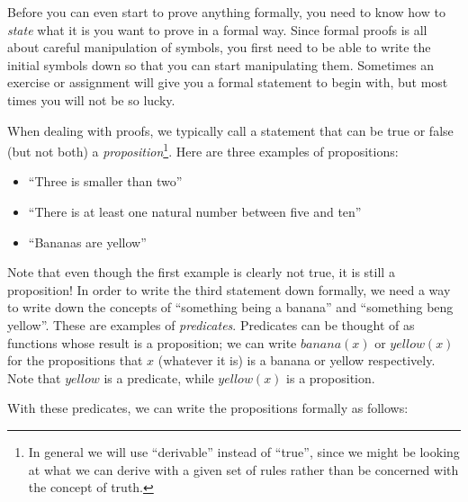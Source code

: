 \documentclass{tufte-handout}
\newcounter{example}
\begin{document}

Before you can even start to prove anything formally, you need to
know how to \emph{state} what it is you want to prove in a formal
way. Since formal proofs is all about careful manipulation of
symbols, you first need to be able to write the initial symbols
down so that you can start manipulating them. Sometimes an
exercise or assignment will give you a formal statement to begin
with, but most times you will not be so lucky.

When dealing with proofs, we typically call a statement that can
be true or false (but not both) a \emph{proposition}\footnote{In
  general we will use ``derivable'' instead of ``true'', since we
  might be looking at what we can derive with a given set of rules
  rather than be concerned with the concept of truth. }. Here are
three examples of propositions:
\begin{itemize}
\item ``Three is smaller than two''
\item ``There is at least one natural number between five
and ten''
\item ``Bananas are yellow''
\end{itemize}

\noindent
Note that even though the first example is clearly not true, it is
still a proposition!
%
In order to write the third statement down formally, we need a way
to write down the concepts of ``something being a banana'' and
``something beng yellow''. These are examples of
\emph{predicates}. Predicates can be thought of as functions whose
result is a proposition; we can write $\mathit{banana}(x)$ or
$\mathit{yellow}(x)$ for the propositions that $x$ (whatever it
is) is a banana or yellow respectively. Note that
$\mathit{yellow}$ is a predicate, while $\mathit{yellow}(x)$ is a
proposition.


With these predicates, we can write the propositions formally as
follows:
\end{document}
